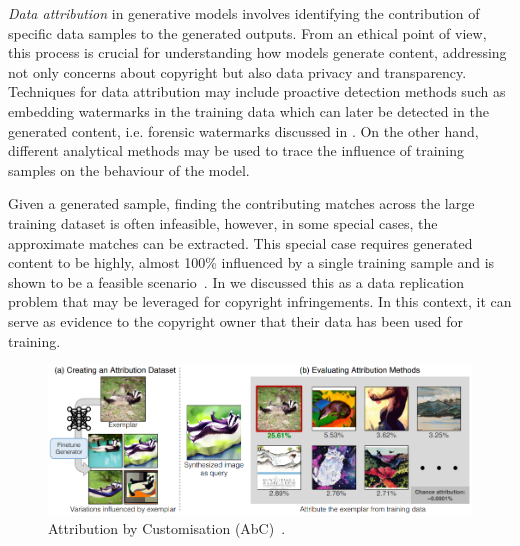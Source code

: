 \documentclass[conference,table]{IEEEtran}
\begin{document}
\textit{Data attribution} in generative models involves identifying the contribution of specific data samples to the generated outputs. 
From an ethical point of view, this process is crucial for understanding how models generate content, addressing not only concerns about copyright but also data privacy and transparency. 
Techniques for data attribution may include proactive detection methods such as embedding watermarks in the training data which can later be detected in the generated content, i.e. forensic watermarks discussed in . 
On the other hand, different analytical methods may be used to trace the influence of training samples on the behaviour of the model. 

Given a generated sample, finding the contributing matches across the large training dataset is often infeasible, however, in some special cases, the approximate matches can be extracted.
This special case requires generated content to be highly, almost 100\% influenced by a single training sample and is shown to be a feasible scenario~\cite{carlini_extracting_2023,somepalli_diffusion_2022}. 
In  we discussed this as a data replication problem that may be leveraged for copyright infringements. 
In this context, it can serve as evidence to the copyright owner that their data has been used for training. 

\begin{figure}
    \centering
    \includegraphics[width=.9\linewidth]{attribution.PNG}
    \caption{Attribution by Customisation (AbC)~\cite{wang_evaluating_2023}.}
    \label{fig:attribution}
\end{figure}
\end{document}
